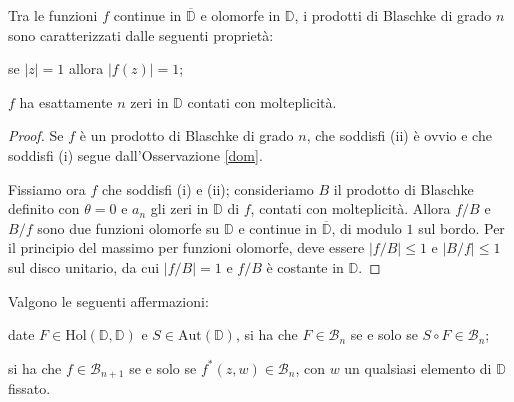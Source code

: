 \begin{lm} \label{Blaschke-car}
  Tra le funzioni $f$ continue in $\overline{\mathbb{D}}$ e olomorfe in $\mathbb{D}$, i prodotti di Blaschke di grado $n$ sono caratterizzati dalle seguenti proprietà:
  \begin{nlist}
    \item se $|z|=1$ allora $|f(z)|=1$;
    \item $f$ ha esattamente $n$ zeri in $\mathbb{D}$ contati con molteplicità.
  \end{nlist}
\end{lm}

\begin{proof}
  Se $f$ è un prodotto di Blaschke di grado $n$, che soddisfi (ii) è ovvio e che soddisfi (i) segue dall'Osservazione \ref{dom}.

  Fissiamo ora $f$ che soddisfi (i) e (ii); consideriamo $B$ il prodotto di Blaschke definito con $\theta=0$ e $a_n$ gli zeri in $\mathbb{D}$ di $f$, contati con molteplicità. Allora $f/B$ e $B/f$ sono due funzioni olomorfe su $\mathbb{D}$ e continue in $\overline{\mathbb{D}}$, di modulo $1$ sul bordo. Per il principio del massimo per funzioni olomorfe, deve essere $|f/B| \le 1$ e $|B/f| \le 1$ sul disco unitario, da cui $|f/B|=1$ e $f/B$ è costante in $\mathbb{D}$.
\end{proof}

\begin{prop} \label{blaschke-prop}
  Valgono le seguenti affermazioni:
  \begin{nlist}
    \item date $F \in \text{Hol}(\mathbb{D},\mathbb{D})$ e $S \in \text{Aut}(\mathbb{D})$, si ha che $F \in \mathcal{B}_n$ se e solo se $S\circ F \in \mathcal{B}_n$;
    \item si ha che $f \in \mathcal{B}_{n+1}$ se e solo se $f^*(z,w) \in \mathcal{B}_n$, con $w$ un qualsiasi elemento di $\mathbb{D}$ fissato.
  \end{nlist}
\end{prop}

